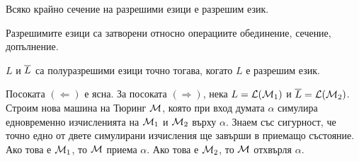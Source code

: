 \begin{corollary}
  Всяко крайно сечение на разрешими езици е разрешим език.
\end{corollary}

\begin{important}
  \begin{theorem}
    Разрешимите езици са затворени относно операциите обединение, сечение, допълнение.
  \end{theorem}
\end{important}


\begin{important}
  \begin{theorem}
    $L$ и $\overline{L}$ са полуразрешими езици точно тогава, когато $L$ е разрешим език.
  \end{theorem}
\end{important}
\begin{hint}
  Посоката $(\Leftarrow)$ е ясна.
  За посоката $(\Rightarrow)$, нека $L = \mathcal{L}(\mathcal{M}_1)$ и $\overline{L} = \mathcal{L}(\mathcal{M}_2)$.
  Строим нова машина на Тюринг $\mathcal{M}$, която при вход думата $\alpha$ симулира едновременно изчисленията на $\mathcal{M}_1$ и $\mathcal{M}_2$ върху $\alpha$.
  Знаем със сигурност, че точно едно от двете симулирани изчисления ще завърши в приемащо състояние.
  Ако това е $\mathcal{M}_1$, то $\mathcal{M}$ приема $\alpha$.
  Ако това е $\mathcal{M}_2$, то $\mathcal{M}$ отхвърля $\alpha$.
\end{hint}

